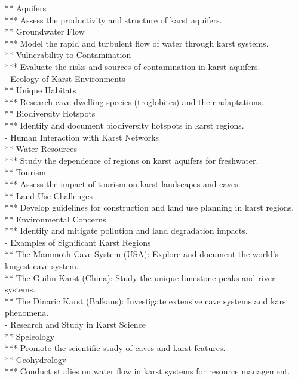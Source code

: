 ** Aquifers \\
*** Assess the productivity and structure of karst aquifers. \\
** Groundwater Flow \\
*** Model the rapid and turbulent flow of water through karst systems. \\
** Vulnerability to Contamination \\
*** Evaluate the risks and sources of contamination in karst aquifers. \\
- Ecology of Karst Environments \\
** Unique Habitats \\
*** Research cave-dwelling species (troglobites) and their adaptations. \\
** Biodiversity Hotspots \\
*** Identify and document biodiversity hotspots in karst regions. \\
- Human Interaction with Karst Networks \\
** Water Resources \\
*** Study the dependence of regions on karst aquifers for freshwater. \\
** Tourism \\
*** Assess the impact of tourism on karst landscapes and caves. \\
** Land Use Challenges \\
*** Develop guidelines for construction and land use planning in karst regions. \\
** Environmental Concerns \\
*** Identify and mitigate pollution and land degradation impacts. \\
- Examples of Significant Karst Regions \\
** The Mammoth Cave System (USA): Explore and document the world's longest cave system. \\
** The Guilin Karst (China): Study the unique limestone peaks and river systems. \\
** The Dinaric Karst (Balkans): Investigate extensive cave systems and karst phenomena. \\
- Research and Study in Karst Science \\
** Speleology \\
*** Promote the scientific study of caves and karst features. \\
** Geohydrology \\
*** Conduct studies on water flow in karst systems for resource management. \\
